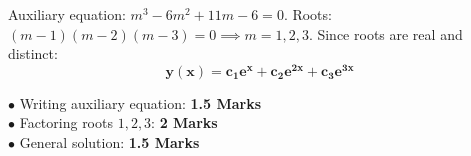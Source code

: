 \begin{solutionbox}
Auxiliary equation: $m^3 - 6m^2 + 11m - 6 = 0$.
Roots: $(m - 1)(m - 2)(m - 3) = 0 \implies m = 1, 2, 3$.
Since roots are real and distinct:
\[
\mathbf{y(x) = c_1 e^x + c_2 e^{2x} + c_3 e^{3x}}
\]
\begin{markingrubric}
$\bullet$ Writing auxiliary equation: \textbf{1.5 Marks}\\
$\bullet$ Factoring roots $1, 2, 3$: \textbf{2 Marks}\\
$\bullet$ General solution: \textbf{1.5 Marks}
\end{markingrubric}
\end{solutionbox}

\newpage
